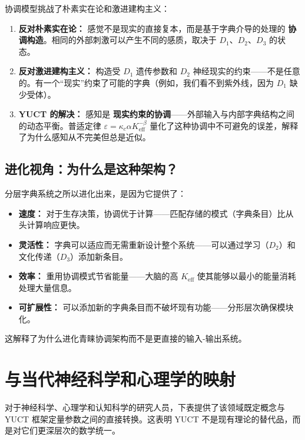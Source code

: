\documentclass[12pt,a4paper]{article}
\newcommand{\eff}{\mathrm{eff}}
\newcommand{\Ke}{K_{\eff}}
\begin{document}
	协调模型挑战了朴素实在论和激进建构主义：
	
	\begin{enumerate}
		\item \textbf{反对朴素实在论：} 感觉不是现实的直接复本，而是基于字典介导的处理的 \textbf{协调构造}。相同的外部刺激可以产生不同的感质，取决于 $D_1$、$D_2$、$D_3$ 的状态。
		\item \textbf{反对激进建构主义：} 构造受 $D_1$ 遗传参数和 $D_2$ 神经现实的约束——不是任意的。有一个“现实”约束了可能的字典（例如，我们看不到紫外线，因为 $D_1$ 缺少受体）。
		\item \textbf{YUCT 的解决：} 感知是 \textbf{现实约束的协调}——外部输入与内部字典结构之间的动态平衡。普适定律 $\varepsilon = \kappa_c \alpha \Ke^{-\beta}$ 量化了这种协调中不可避免的误差，解释了为什么感知从不完美但总是近似。
	\end{enumerate}
	
	\subsection{进化视角：为什么是这种架构？}
	
	分层字典系统之所以进化出来，是因为它提供了：
	
	\begin{itemize}
		\item \textbf{速度：} 对于生存决策，协调优于计算——匹配存储的模式（字典条目）比从头计算响应更快。
		\item \textbf{灵活性：} 字典可以适应而无需重新设计整个系统——可以通过学习（$D_2$）和文化传递（$D_3$）添加新条目。
		\item \textbf{效率：} 重用协调模式节省能量——大脑的高 $\Ke$ 使其能够以最小的能量消耗处理大量信息。
		\item \textbf{可扩展性：} 可以添加新的字典条目而不破坏现有功能——分形层次确保模块化。
	\end{itemize}
	
	这解释了为什么进化青睐协调架构而不是更直接的输入-输出系统。
	
	\section{与当代神经科学和心理学的映射}
	
	对于神经科学、心理学和认知科学的研究人员，下表提供了该领域既定概念与 YUCT 框架定量参数之间的直接转换。这表明 YUCT 不是现有理论的替代品，而是对它们更深层次的数学统一。
	
\end{document}
